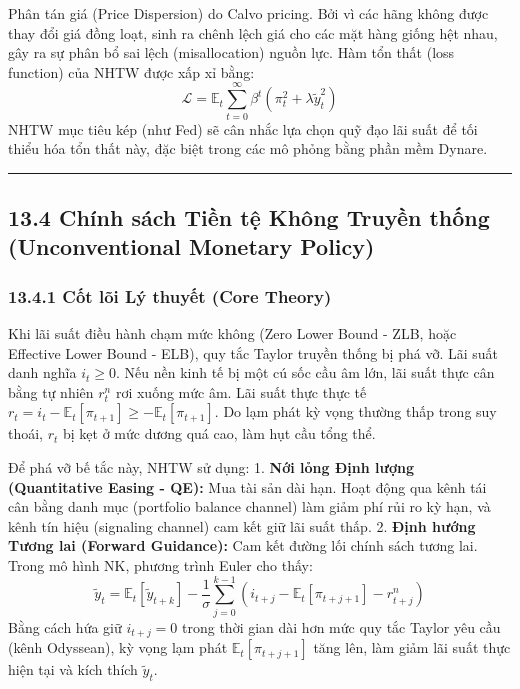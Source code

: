 \documentclass[
]{article}
\begin{document}
Phân tán giá (Price Dispersion) do Calvo pricing. Bởi vì các hãng không
được thay đổi giá đồng loạt, sinh ra chênh lệch giá cho các mặt hàng
giống hệt nhau, gây ra sự phân bổ sai lệch (misallocation) nguồn lực.
Hàm tổn thất (loss function) của NHTW được xấp xỉ bằng:
\[ \mathcal{L} = \mathbb{E}_t \sum_{t=0}^\infty \beta^t (\pi_t^2 + \lambda \tilde{y}_t^2) \]
NHTW mục tiêu kép (như Fed) sẽ cân nhắc lựa chọn quỹ đạo lãi suất để tối
thiểu hóa tổn thất này, đặc biệt trong các mô phỏng bằng phần mềm
Dynare.

\begin{center}\rule{0.5\linewidth}{0.5pt}\end{center}

\subsection{13.4 Chính sách Tiền tệ Không Truyền thống (Unconventional
Monetary
Policy)}\label{chuxednh-suxe1ch-tiux1ec1n-tux1ec7-khuxf4ng-truyux1ec1n-thux1ed1ng-unconventional-monetary-policy}

\subsubsection{13.4.1 Cốt lõi Lý thuyết (Core
Theory)}\label{cux1ed1t-luxf5i-luxfd-thuyux1ebft-core-theory-42}

Khi lãi suất điều hành chạm mức không (Zero Lower Bound - ZLB, hoặc
Effective Lower Bound - ELB), quy tắc Taylor truyền thống bị phá vỡ. Lãi
suất danh nghĩa \(i_t \ge 0\). Nếu nền kinh tế bị một cú sốc cầu âm lớn,
lãi suất thực cân bằng tự nhiên \(r_t^n\) rơi xuống mức âm. Lãi suất
thực thực tế
\(r_t = i_t - \mathbb{E}_t[\pi_{t+1}] \ge -\mathbb{E}_t[\pi_{t+1}]\). Do
lạm phát kỳ vọng thường thấp trong suy thoái, \(r_t\) bị kẹt ở mức dương
quá cao, làm hụt cầu tổng thể.

Để phá vỡ bế tắc này, NHTW sử dụng: 1. \textbf{Nới lỏng Định lượng
(Quantitative Easing - QE):} Mua tài sản dài hạn. Hoạt động qua kênh tái
cân bằng danh mục (portfolio balance channel) làm giảm phí rủi ro kỳ
hạn, và kênh tín hiệu (signaling channel) cam kết giữ lãi suất thấp. 2.
\textbf{Định hướng Tương lai (Forward Guidance):} Cam kết đường lối
chính sách tương lai. Trong mô hình NK, phương trình Euler cho thấy:
\[ \tilde{y}_t = \mathbb{E}_t [\tilde{y}_{t+k}] - \frac{1}{\sigma} \sum_{j=0}^{k-1} (i_{t+j} - \mathbb{E}_t[\pi_{t+j+1}] - r_{t+j}^n) \]
Bằng cách hứa giữ \(i_{t+j} = 0\) trong thời gian dài hơn mức quy tắc
Taylor yêu cầu (kênh Odyssean), kỳ vọng lạm phát
\(\mathbb{E}_t[\pi_{t+j+1}]\) tăng lên, làm giảm lãi suất thực hiện tại
và kích thích \(\tilde{y}_t\).
\end{document}
